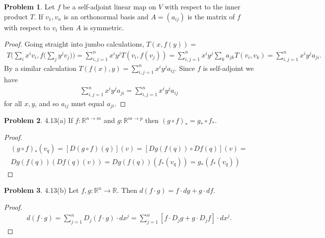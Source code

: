 \documentclass[20pt]{article}
\theoremstyle{plain}
\theoremstyle{definition}
\newtheorem*{problem}{Problem}
\newcommand{\reals}{\mathbb{R}}
\begin{document}
\begin{problem}{4.11}
  Let $f$ be a self-adjoint linear map on $V$ with respect to the inner product
  $T$.  If $v_1, v_n$ is an orthonormal basis and $A = (a_{ij})$ is the matrix of 
  $f$ with respect to $v_i$ then $A$ is symmetric.
\end{problem}
\begin{proof}
  Going straight into jumbo calculations, $T(x, f(y)) = $
  \begin{align*}
    T \bigg( \sum_i x^iv_i, f \bigg( \sum_j y^jv_j  \bigg) \bigg) =
    \sum_{i,j = 1}^n x^iy^jT(v_i, f(v_j)) =
    \sum_{i,j = 1}^n x^iy^j \sum_k a_{jk} T(v_i, v_k) =
    \sum_{i,j = 1}^n x^iy^ja_{ji}.
  \end{align*}
  By a similar calculation $T(f(x), y) = \sum_{i,j = 1}^n x^iy^ja_{ij}$.
  Since $f$ is self-adjoint we have 
  \begin{align*}
    \sum_{i,j = 1}^n x^iy^ja_{ji} = \sum_{i,j = 1}^n x^iy^ja_{ij}
  \end{align*}
  for all $x, y$, and so $a_{ij}$ must equal $a_{ji}.$
\end{proof}


































\begin{problem}{4.13(a)}
  If $f: \reals^{n \to m}$ and $g: \reals^{m \to p}$ then $(g \circ f)_* = g_* \circ f_*$.
\end{problem}

\begin{proof}
  \begin{align*}
      (g \circ f)_*(v_q) = 
      [D(g \circ f)(q)](v) = 
      [Dg(f(q))\circ Df(q)](v) = \\
      Dg(f(q))(Df(q)(v)) = 
      Dg(f(q)) (f_*(v_q)) = g_*(f_*(v_q))
  \end{align*}
\end{proof}


\begin{problem}{4.13(b)}
  Let $f, g : \reals^n \to \reals$. Then $d(f\cdot g) = f \cdot dg  + g \cdot df.$
\end{problem}

\begin{proof}
  \begin{align*}
    d(f \cdot g) =
    \sum_{j=1}^n D_j(f \cdot g) \cdot dx^j = 
    \sum_{j=1}^n [f \cdot D_jg + g \cdot  D_jf] \cdot dx^j.
  \end{align*}
\end{proof}
\end{document}
